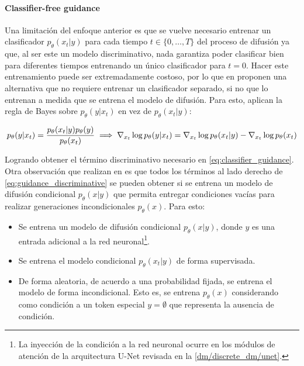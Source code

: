 \paragraph{Classifier-free guidance}

Una limitación del enfoque anterior es que se vuelve necesario entrenar un clasificador $p_\theta(x_t|y)$ para cada tiempo $t\in\{0,\ldots,T\}$ del proceso de difusión ya que, al ser este un modelo discriminativo, nada garantiza poder clasificar bien para diferentes tiempos entrenando un único clasificador para $t=0$. Hacer este entrenamiento puede ser extremadamente costoso, por lo que en \cite{ho2022classifierfreediffusionguidance} proponen una alternativa que no requiere entrenar un clasificador separado, si no que lo entrenan a medida que se entrena el modelo de difusión. Para esto, aplican la regla de Bayes sobre $p_\theta(y|x_t)$ en vez de $p_\theta(x_t|y)$:

\begin{equation}
    \label{eq:guidance_discriminative}
    p_\theta(y|x_t) = \frac{p_\theta(x_t|y)p_\theta(y)}{p_\theta(x_t)}
    \implies
    \nabla_{x_t} \log p_\theta(y|x_t) = \nabla_{x_t} \log p_\theta(x_t|y) - \nabla_{x_t} \log p_\theta(x_t)
\end{equation}

Logrando obtener el término discriminativo necesario en \eqref{eq:classifier_guidance}. Otra observación que realizan en \cite{ho2022classifierfreediffusionguidance} es que todos los términos al lado derecho de \eqref{eq:guidance_discriminative} se pueden obtener si se entrena un modelo de difusión condicional $p_\theta(x|y)$ que permita entregar condiciones vacías para realizar generaciones incondicionales $p_\theta(x)$. Para esto:

\begin{itemize}
    \item Se entrena un modelo de difusión condicional $p_\theta(x|y)$, donde $y$ es una entrada adicional a la red neuronal\footnote{La inyección de la condición a la red neuronal ocurre en los módulos de atención de la arquitectura U-Net revisada en la \autoref{dm/discrete_dm/unet}.}.
    \item Se entrena el modelo condicional $p_\theta(x_t|y)$ de forma supervisada.
    \item De forma aleatoria, de acuerdo a una probabilidad fijada, se entrena el modelo de forma incondicional. Esto es, se entrena $p_\theta(x)$ considerando como condición a un token especial $y=\emptyset$ que representa la ausencia de condición.
\end{itemize}

